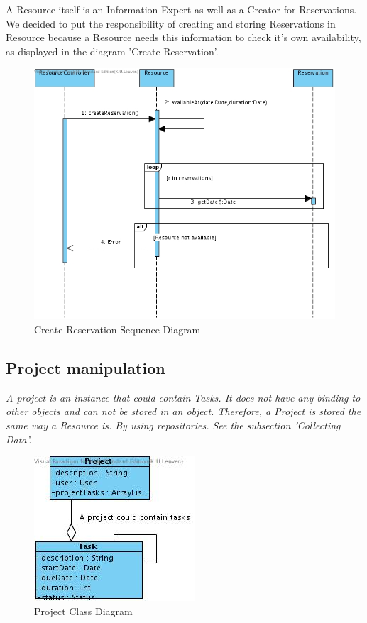 			A Resource itself is an Information Expert as well as a Creator for Reservations. We decided to put the responsibility of creating and storing Reservations in Resource because a Resource needs this information to check it's own availability, as displayed in the diagram 'Create Reservation'.
			\begin{figure}[H]
				\begin{center}
					\includegraphics[scale=0.5]{images/create_reservation.jpg}
				\end{center}
				\caption{Create Reservation Sequence Diagram}
			\end{figure}
			
			
			\subsection{Project manipulation}
			\emph{A project is an instance that could contain Tasks. It does not have any binding to other objects and can not be stored in an object. Therefore, a Project is stored the same way a Resource is. By using repositories. See the subsection 'Collecting Data'.}
			\begin{figure}[H]
				\begin{center}
					\includegraphics[scale=0.5]{images/project_class_diagram.jpg}
				\end{center}
				\caption{Project Class Diagram}
			\end{figure}
			
